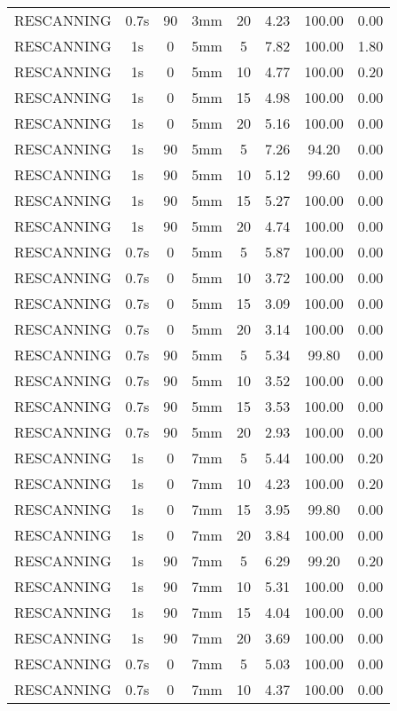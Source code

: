 \begin{table}[H]
\begin{tabular}{|c||c|c|c|c||c|c|c|}
RESCANNING & 0.7s & 90 & 3mm & 20 & 4.23 & 100.00 & 0.00 \\
RESCANNING & 1s & 0 & 5mm & 5 & 7.82 & 100.00 & 1.80 \\
RESCANNING & 1s & 0 & 5mm & 10 & 4.77 & 100.00 & 0.20 \\
RESCANNING & 1s & 0 & 5mm & 15 & 4.98 & 100.00 & 0.00 \\
RESCANNING & 1s & 0 & 5mm & 20 & 5.16 & 100.00 & 0.00 \\
RESCANNING & 1s & 90 & 5mm & 5 & 7.26 & 94.20 & 0.00 \\
RESCANNING & 1s & 90 & 5mm & 10 & 5.12 & 99.60 & 0.00 \\
RESCANNING & 1s & 90 & 5mm & 15 & 5.27 & 100.00 & 0.00 \\
RESCANNING & 1s & 90 & 5mm & 20 & 4.74 & 100.00 & 0.00 \\
RESCANNING & 0.7s & 0 & 5mm & 5 & 5.87 & 100.00 & 0.00 \\
RESCANNING & 0.7s & 0 & 5mm & 10 & 3.72 & 100.00 & 0.00 \\
RESCANNING & 0.7s & 0 & 5mm & 15 & 3.09 & 100.00 & 0.00 \\
RESCANNING & 0.7s & 0 & 5mm & 20 & 3.14 & 100.00 & 0.00 \\
RESCANNING & 0.7s & 90 & 5mm & 5 & 5.34 & 99.80 & 0.00 \\
RESCANNING & 0.7s & 90 & 5mm & 10 & 3.52 & 100.00 & 0.00 \\
RESCANNING & 0.7s & 90 & 5mm & 15 & 3.53 & 100.00 & 0.00 \\
RESCANNING & 0.7s & 90 & 5mm & 20 & 2.93 & 100.00 & 0.00 \\
RESCANNING & 1s & 0 & 7mm & 5 & 5.44 & 100.00 & 0.20 \\
RESCANNING & 1s & 0 & 7mm & 10 & 4.23 & 100.00 & 0.20 \\
RESCANNING & 1s & 0 & 7mm & 15 & 3.95 & 99.80 & 0.00 \\
RESCANNING & 1s & 0 & 7mm & 20 & 3.84 & 100.00 & 0.00 \\
RESCANNING & 1s & 90 & 7mm & 5 & 6.29 & 99.20 & 0.20 \\
RESCANNING & 1s & 90 & 7mm & 10 & 5.31 & 100.00 & 0.00 \\
RESCANNING & 1s & 90 & 7mm & 15 & 4.04 & 100.00 & 0.00 \\
RESCANNING & 1s & 90 & 7mm & 20 & 3.69 & 100.00 & 0.00 \\
RESCANNING & 0.7s & 0 & 7mm & 5 & 5.03 & 100.00 & 0.00 \\
RESCANNING & 0.7s & 0 & 7mm & 10 & 4.37 & 100.00 & 0.00 \\

\end{tabular}
\end{table}
